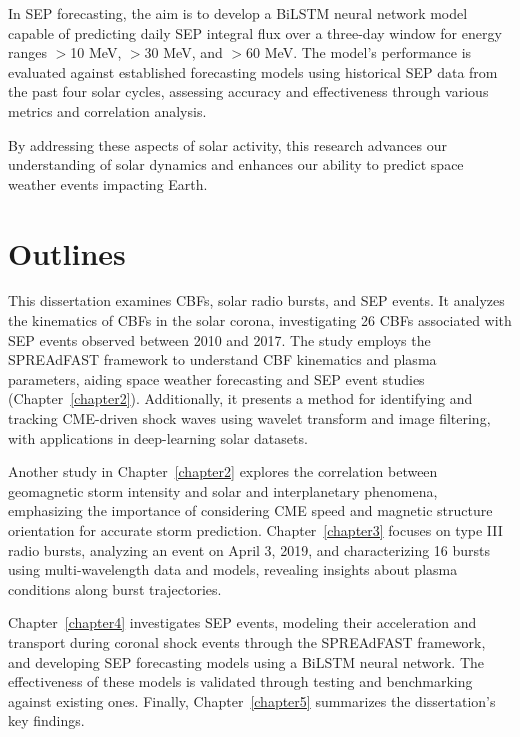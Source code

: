 In SEP forecasting, the aim is to develop a BiLSTM neural network model capable of predicting daily SEP integral flux over a three-day window for energy ranges $>$10 MeV, $>$30 MeV, and $>$60 MeV. The model's performance is evaluated against established forecasting models using historical SEP data from the past four solar cycles, assessing accuracy and effectiveness through various metrics and correlation analysis.

By addressing these aspects of solar activity, this research advances our understanding of solar dynamics and enhances our ability to predict space weather events impacting Earth.

\section{Outlines}
This dissertation examines CBFs, solar radio bursts, and SEP events. It analyzes the kinematics of CBFs in the solar corona, investigating 26 CBFs associated with SEP events observed between 2010 and 2017. The study employs the SPREAdFAST framework to understand CBF kinematics and plasma parameters, aiding space weather forecasting and SEP event studies (Chapter~\ref{chapter2}). Additionally, it presents a method for identifying and tracking CME-driven shock waves using wavelet transform and image filtering, with applications in deep-learning solar datasets.

Another study in Chapter~\ref{chapter2} explores the correlation between geomagnetic storm intensity and solar and interplanetary phenomena, emphasizing the importance of considering CME speed and magnetic structure orientation for accurate storm prediction. Chapter~\ref{chapter3} focuses on type III radio bursts, analyzing an event on April 3, 2019, and characterizing 16 bursts using multi-wavelength data and models, revealing insights about plasma conditions along burst trajectories.

Chapter~\ref{chapter4} investigates SEP events, modeling their acceleration and transport during coronal shock events through the SPREAdFAST framework, and developing SEP forecasting models using a BiLSTM neural network. The effectiveness of these models is validated through testing and benchmarking against existing ones. Finally, Chapter~\ref{chapter5} summarizes the dissertation's key findings.